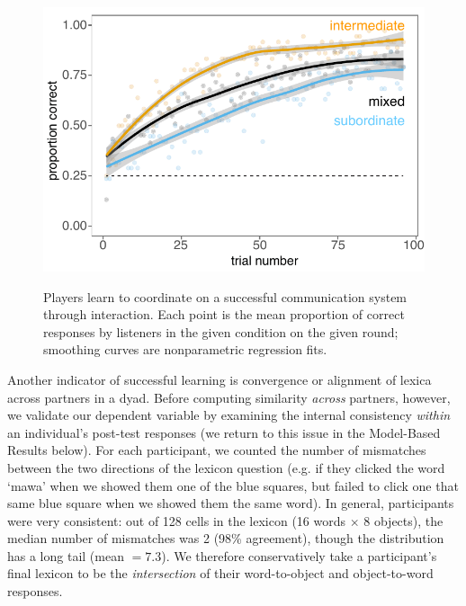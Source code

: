 \documentclass[10pt,letterpaper]{article}
\begin{document}
\begin{figure}[t]
\begin{center}
{\includegraphics[scale=0.65]{accuracyByCondition_edited.pdf}}
{\caption{{Players learn to coordinate on a successful communication system through interaction. Each point is the mean proportion of correct responses by listeners in the given condition on the given round; smoothing curves are nonparametric regression fits.  %
\label{fig:accuracy}}}}
\vspace{-.5cm}
\end{center}
\end{figure}

Another indicator of successful learning is convergence or alignment of lexica across partners in a dyad. Before computing similarity \emph{across} partners, however, we validate our dependent variable by examining the internal consistency \emph{within} an individual's post-test responses (we return to this issue in the Model-Based Results below). For each participant, we counted the number of mismatches between the two directions of the lexicon question (e.g. if they clicked the word `mawa' when we showed them one of the blue squares, but failed to click one that same blue square when we showed them the same word). In general, participants were very consistent: out of 128 cells in the lexicon (16 words $\times$ 8 objects), the median number of mismatches was 2 (98\% agreement), though the distribution has a long tail (mean $= 7.3$). We therefore conservatively take a participant's final lexicon to be the \emph{intersection} of their word-to-object and object-to-word responses.
\end{document}
